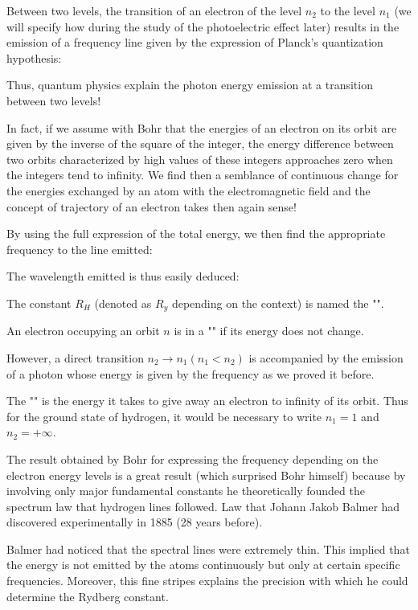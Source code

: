Between two levels, the transition of an electron of the level $n_2$ to the level $n_1$ (we will specify how during the study of the photoelectric effect later) results in the emission of a frequency line given by the expression of Planck's quantization hypothesis:
	
Thus, quantum physics explain the photon energy emission at a transition between two levels!

In fact, if we assume with Bohr that the energies of an electron on its orbit are given by the inverse of the square of the integer, the energy difference between two orbits characterized by high values of these integers approaches zero when the integers tend to infinity. We find then a semblance of continuous change for the energies exchanged by an atom with the electromagnetic field and the concept of trajectory of an electron takes then again sense!

By using the full expression of the total energy, we then find the appropriate frequency to the line emitted:
	
The wavelength emitted is thus easily deduced:
	
The constant $R_H$ (denoted as $R_y$ depending on the context) is named the "".

An electron occupying an orbit $n$ is in a "" if its energy does not change.

However, a direct transition $n_2 \rightarrow n_1 (n_1<n_2)$ is accompanied by the emission of a photon whose energy is given by the frequency as we proved it before.

The "" is the energy it takes to give away an electron to infinity of its orbit. Thus for the ground state of hydrogen, it would be necessary to write $n_1=1$ and $n_2=+\infty$.

The result obtained by Bohr for expressing the frequency depending on the electron energy levels is a great result (which surprised Bohr himself) because by involving only major fundamental constants he theoretically founded the spectrum law that hydrogen lines followed. Law that Johann Jakob Balmer had discovered experimentally in 1885 (28 years before).

Balmer had noticed that the spectral lines were extremely thin. This implied that the energy is not emitted by the atoms continuously but only at certain specific frequencies. Moreover, this fine stripes explains the precision with which he could determine the Rydberg constant.

